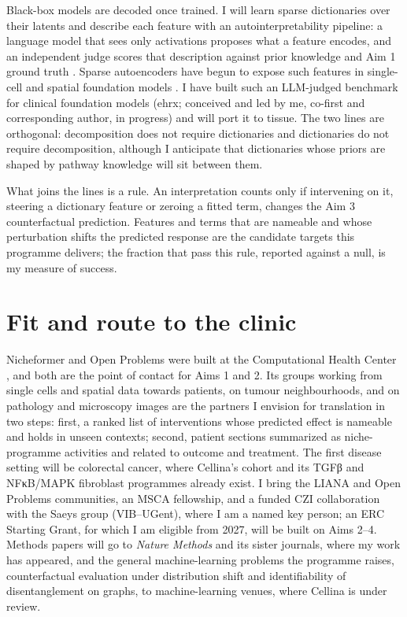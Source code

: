 \documentclass[11pt,a4paper]{article}
\begin{document}
Black-box models are decoded once trained. I will learn sparse dictionaries over their latents and describe each feature with an autointerpretability pipeline: a language model that sees only activations proposes what a feature encodes, and an independent judge scores that description against prior knowledge and Aim 1 ground truth \citep{bricken2023monosemanticity, templeton2024scaling, paulo2025autointerp}. Sparse autoencoders have begun to expose such features in single-cell and spatial foundation models \citep{pedrocchi2025saescfm, handa2026saffron, kendiukhov2026atlas}. I have built such an LLM-judged benchmark for clinical foundation models (ehrx; conceived and led by me, co-first and corresponding author, in progress) and will port it to tissue. The two lines are orthogonal: decomposition does not require dictionaries and dictionaries do not require decomposition, although I anticipate that dictionaries whose priors are shaped by pathway knowledge will sit between them.

What joins the lines is a rule. An interpretation counts only if intervening on it, steering a dictionary feature or zeroing a fitted term, changes the Aim 3 counterfactual prediction. Features and terms that are nameable and whose perturbation shifts the predicted response are the candidate targets this programme delivers; the fraction that pass this rule, reported against a null, is my measure of success.

\section{Fit and route to the clinic}

Nicheformer and Open Problems were built at the Computational Health Center \citep{tejadalapuerta2025nicheformer, luecken2025openproblems}, and both are the point of contact for Aims 1 and 2. Its groups working from single cells and spatial data towards patients, on tumour neighbourhoods, and on pathology and microscopy images are the partners I envision for translation in two steps: first, a ranked list of interventions whose predicted effect is nameable and holds in unseen contexts; second, patient sections summarized as niche-programme activities and related to outcome and treatment. The first disease setting will be colorectal cancer, where Cellina's cohort and its TGFβ and NFκB/MAPK fibroblast programmes already exist. I bring the LIANA and Open Problems communities, an MSCA fellowship, and a funded CZI collaboration with the Saeys group (VIB--UGent), where I am a named key person; an ERC Starting Grant, for which I am eligible from 2027, will be built on Aims 2--4. Methods papers will go to \emph{Nature Methods} and its sister journals, where my work has appeared, and the general machine-learning problems the programme raises, counterfactual evaluation under distribution shift and identifiability of disentanglement on graphs, to machine-learning venues, where Cellina is under review.
\end{document}
